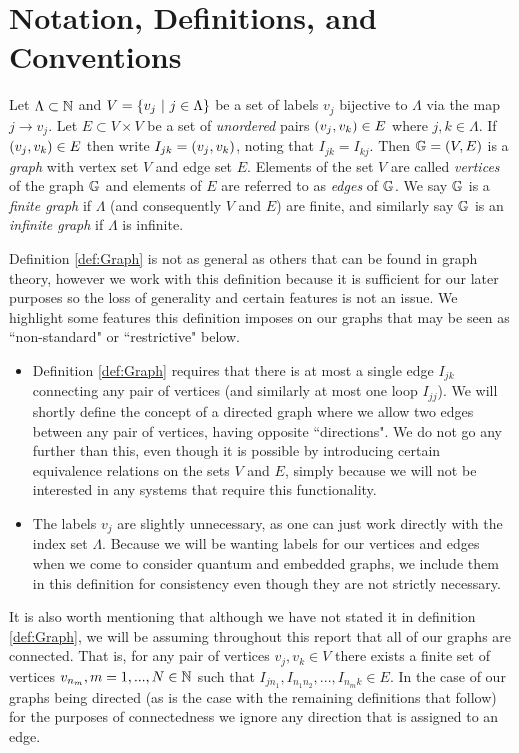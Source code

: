 \section{Notation, Definitions, and Conventions} \label{sec:QG-Notation}
\begin{definition}[Graph] \label{def:Graph}
	Let $\Lambda\subset\mathbb{N}$ and $V=\left\{ v_j \ \vert \ j\in\Lambda \right\}$ be a set of labels $v_j$ bijective to $\Lambda$ via the map $j\rightarrow v_j$.
	Let $E\subset V\times V$ be a set of \textit{unordered} pairs $\left( v_j,v_k \right)\in E$ where $j,k\in\Lambda$.
	If $\left( v_j,v_k \right)\in E$ then write $I_{jk} = \left( v_j,v_k \right)$, noting that $I_{jk}=I_{kj}$.
	Then $\mathbb{G}=\left( V,E \right)$ is a \textit{graph} with vertex set $V$ and edge set $E$.
	Elements of the set $V$ are called \textit{vertices} of the graph $\mathbb{G}$ and elements of $E$ are referred to as \textit{edges} of $\mathbb{G}$. \newline
	We say $\mathbb{G}$ is a \textit{finite graph} if $\Lambda$ (and consequently $V$ and $E$) are finite, and similarly say $\mathbb{G}$ is an \textit{infinite graph} if $\Lambda$ is infinite.
\end{definition}
Definition \ref{def:Graph} is not as general as others that can be found in graph theory, however we work with this definition because it is sufficient for our later purposes so the loss of generality and certain features is not an issue.
We highlight some features this definition imposes on our graphs that may be seen as ``non-standard" or ``restrictive" below.
\begin{itemize}
	\item Definition \ref{def:Graph} requires that there is at most a single edge $I_{jk}$ connecting any pair of vertices (and similarly at most one loop $I_{jj}$).
	We will shortly define the concept of a directed graph where we allow two edges between any pair of vertices, having opposite ``directions".
	We do not go any further than this, even though it is possible by introducing certain equivalence relations on the sets $V$ and $E$, simply because we will not be interested in any systems that require this functionality.
	\item The labels $v_j$ are slightly unnecessary, as one can just work directly with the index set $\Lambda$.
	Because we will be wanting labels for our vertices and edges when we come to consider quantum and embedded graphs, we include them in this definition for consistency even though they are not strictly necessary.
\end{itemize}
It is also worth mentioning that although we have not stated it in definition \ref{def:Graph}, we will be assuming throughout this report that all of our graphs are connected.
That is, for any pair of vertices $v_j, v_k\in V$ there exists a finite set of vertices $v_{n_m}, m=1,...,N\in\mathbb{N}$ such that $I_{jn_1}, I_{n_1 n_2}, ... , I_{n_m k}\in E$.
In the case of our graphs being directed (as is the case with the remaining definitions that follow) for the purposes of connectedness we ignore any direction that is assigned to an edge. \newline

